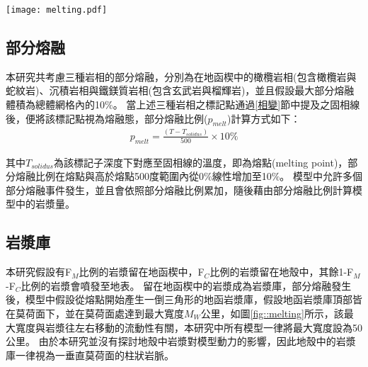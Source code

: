 \begin{figure*}[ht]
    \centering
    \texttt{[image: melting.pdf]}
    \caption[模型內岩漿作用示意圖。]{模型內岩漿作用示意圖。圖中繪製兩個不同的部分熔融事件。每個獨立部分熔融事件會對應獨立的岩漿庫。
    模型中有F$_M$比例的岩漿留在地函楔中，F$_C$比例的岩漿留在地殼中，其餘1-F$_M$-F$_C$比例的岩漿會噴發至地表形成火山島弧，如圖上方紅紫色三角形。
    地函岩漿庫中的岩漿均勻分布在圖中地函楔中紅橘色倒三角形。
    圖中假設部分熔融事件二的部分熔融體積為a$_2$地函岩漿庫體積為A$_{M2}$。
    }
    \label{fig::melting}
\end{figure*}

\subsection{部分熔融}\label{部分熔融}
本研究共考慮三種岩相的部分熔融，分別為在地函楔中的橄欖岩相(包含橄欖岩與蛇紋岩)、沉積岩相與鐵鎂質岩相(包含玄武岩與榴輝岩)，並且假設最大部分熔融體積為總體網格內的10$\%$。
當上述三種岩相之標記點通過\ref{相變}節中提及之固相線後，便將該標記點視為熔融態，部分熔融比例($p_{melt}$)計算方式如下：
\begin{align}
    p_{melt}=\frac{(T-T_{solidus})}{500}\times 10\% \label{eq:melting}
\end{align}

其中$T_{solidus}$為該標記子深度下對應至固相線的溫度，即為熔點(melting point)，部分熔融比例在熔點與高於熔點500度範圍內從0$\%$線性增加至10$\%$。
模型中允許多個部分熔融事件發生，並且會依照部分熔融比例累加，隨後藉由部分熔融比例計算模型中的岩漿量。

\subsection{岩漿庫}\label{岩漿庫}
本研究假設有F$_M$比例的岩漿留在地函楔中，F$_C$比例的岩漿留在地殼中，其餘1-F$_M$-F$_C$比例的岩漿會噴發至地表。
留在地函楔中的岩漿成為岩漿庫，部分熔融發生後，模型中假設從熔點開始產生一倒三角形的地函岩漿庫，假設地函岩漿庫頂部皆在莫荷面下，並在莫荷面處達到最大寬度$M_W$公里，如圖\ref{fig::melting}所示，該最大寬度與岩漿往左右移動的流動性有關，本研究中所有模型一律將最大寬度設為50公里。
由於本研究並沒有探討地殼中岩漿對模型動力的影響，因此地殼中的岩漿庫一律視為一垂直莫荷面的柱狀岩脈。

